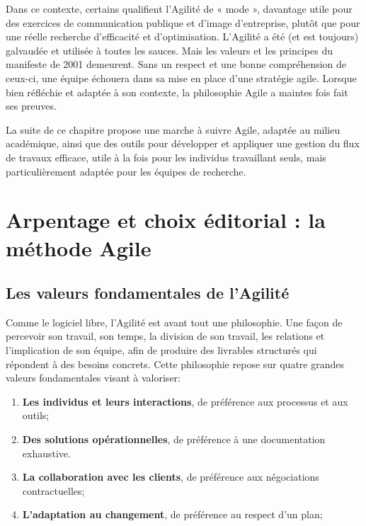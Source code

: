\documentclass[
  letterpaper,
  DIV=11,
  numbers=noendperiod,
  oneside]{scrreprt}
\providecommand{\tightlist}{%
  \setlength{\itemsep}{0pt}\setlength{\parskip}{0pt}}\usepackage{longtable,booktabs,array}
\begin{document}
Dans ce contexte, certains qualifient l'Agilité de « mode », davantage
utile pour des exercices de communication publique et d'image
d'entreprise, plutôt que pour une réelle recherche d'efficacité et
d'optimisation. L'Agilité a été (et est toujours) galvaudée et utilisée
à toutes les sauces. Mais les valeurs et les principes du manifeste de
2001 demeurent. Sans un respect et une bonne compréhension de ceux-ci,
une équipe échouera dans sa mise en place d'une stratégie agile. Lorsque
bien réfléchie et adaptée à son contexte, la philosophie Agile a maintes
fois fait ses preuves.

La suite de ce chapitre propose une marche à suivre Agile, adaptée au
milieu académique, ainsi que des outils pour développer et appliquer une
gestion du flux de travaux efficace, utile à la fois pour les individus
travaillant seuls, mais particulièrement adaptée pour les équipes de
recherche.

\hypertarget{arpentage-et-choix-uxe9ditorial-la-muxe9thode-agile}{%
\section{Arpentage et choix éditorial : la méthode
Agile}\label{arpentage-et-choix-uxe9ditorial-la-muxe9thode-agile}}

\hypertarget{les-valeurs-fondamentales-de-lagilituxe9}{%
\subsection{Les valeurs fondamentales de
l'Agilité}\label{les-valeurs-fondamentales-de-lagilituxe9}}

Comme le logiciel libre, l'Agilité est avant tout une philosophie. Une
façon de percevoir son travail, son temps, la division de son travail,
les relations et l'implication de son équipe, afin de produire des
livrables structurés qui répondent à des besoins concrets. Cette
philosophie repose sur quatre grandes valeurs fondamentales visant à
valoriser:

\begin{enumerate}
\def\labelenumi{\arabic{enumi}.}
\tightlist
\item
  \textbf{Les individus et leurs interactions}, de préférence aux
  processus et aux outils;
\item
  \textbf{Des solutions opérationnelles}, de préférence à une
  documentation exhaustive.
\item
  \textbf{La collaboration avec les clients}, de préférence aux
  négociations contractuelles;
\item
  \textbf{L'adaptation au changement}, de préférence au respect d'un
  plan;
\end{enumerate}
\end{document}
